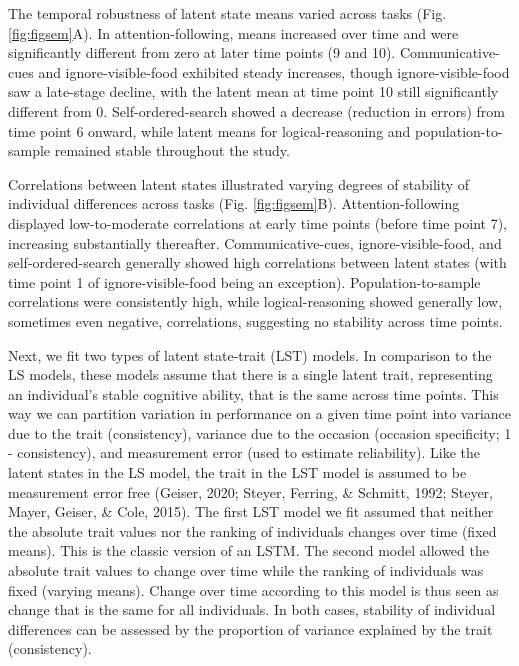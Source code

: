 \documentclass[
  man,floatsintext]{apa6}
\begin{document}
The temporal robustness of latent state means varied across tasks (Fig. \ref{fig:figsem}A). In attention-following, means increased over time and were significantly different from zero at later time points (9 and 10). Communicative-cues and ignore-visible-food exhibited steady increases, though ignore-visible-food saw a late-stage decline, with the latent mean at time point 10 still significantly different from 0. Self-ordered-search showed a decrease (reduction in errors) from time point 6 onward, while latent means for logical-reasoning and population-to-sample remained stable throughout the study.

Correlations between latent states illustrated varying degrees of stability of individual differences across tasks (Fig. \ref{fig:figsem}B). Attention-following displayed low-to-moderate correlations at early time points (before time point 7), increasing substantially thereafter. Communicative-cues, ignore-visible-food, and self-ordered-search generally showed high correlations between latent states (with time point 1 of ignore-visible-food being an exception). Population-to-sample correlations were consistently high, while logical-reasoning showed generally low, sometimes even negative, correlations, suggesting no stability across time points.

Next, we fit two types of latent state-trait (LST) models. In comparison to the LS models, these models assume that there is a single latent trait, representing an individual's stable cognitive ability, that is the same across time points. This way we can partition variation in performance on a given time point into variance due to the trait (consistency), variance due to the occasion (occasion specificity; 1 - consistency), and measurement error (used to estimate reliability). Like the latent states in the LS model, the trait in the LST model is assumed to be measurement error free (Geiser, 2020; Steyer, Ferring, \& Schmitt, 1992; Steyer, Mayer, Geiser, \& Cole, 2015). The first LST model we fit assumed that neither the absolute trait values nor the ranking of individuals changes over time (fixed means). This is the classic version of an LSTM. The second model allowed the absolute trait values to change over time while the ranking of individuals was fixed (varying means). Change over time according to this model is thus seen as change that is the same for all individuals. In both cases, stability of individual differences can be assessed by the proportion of variance explained by the trait (consistency).
\end{document}
